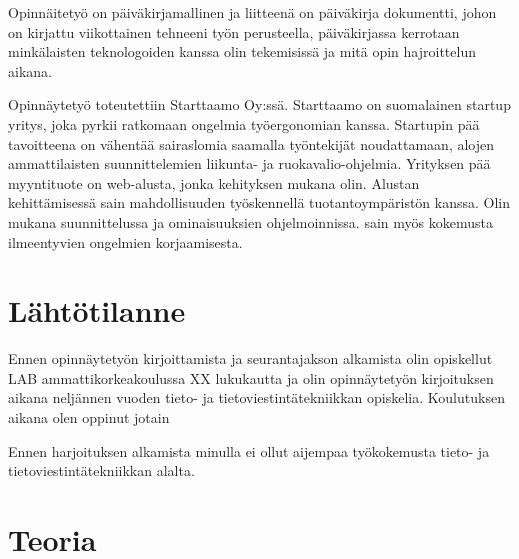 \documentclass[11pt,a4paper,titlepage,oneside]{article}
\begin{document}
Opinnäitetyö on päiväkirjamallinen ja liitteenä on päiväkirja dokumentti, 
johon on kirjattu viikottainen tehneeni työn perusteella, päiväkirjassa kerrotaan
minkälaisten teknologoiden kanssa olin tekemisissä ja mitä opin hajroittelun aikana.
\medskip


Opinnäytetyö toteutettiin Starttaamo Oy:ssä. Starttaamo on suomalainen startup yritys, joka pyrkii ratkomaan ongelmia työergonomian kanssa.
Startupin pää tavoitteena on vähentää sairaslomia saamalla työntekijät noudattamaan, alojen ammattilaisten suunnittelemien liikunta- ja ruokavalio-ohjelmia. 
Yrityksen pää myyntituote on web-alusta, jonka kehityksen mukana olin.
%
Alustan kehittämisessä sain mahdollisuuden työskennellä tuotantoympäristön kanssa.
Olin mukana suunnittelussa ja ominaisuuksien ohjelmoinnissa. sain myös kokemusta ilmeentyvien ongelmien korjaamisesta.

\medskip






\newpage
\section{Lähtötilanne}         %


Ennen opinnäytetyön kirjoittamista ja seurantajakson alkamista olin opiskellut LAB ammattikorkeakoulussa XX lukukautta ja olin opinnäytetyön kirjoituksen aikana neljännen vuoden tieto- ja tietoviestintätekniikkan opiskelia.
Koulutuksen aikana olen oppinut jotain 

\medskip



Ennen harjoituksen alkamista minulla ei ollut aijempaa työkokemusta tieto- ja tietoviestintätekniikkan alalta.
\medskip







\newpage
\section{Teoria}                %
\end{document}
